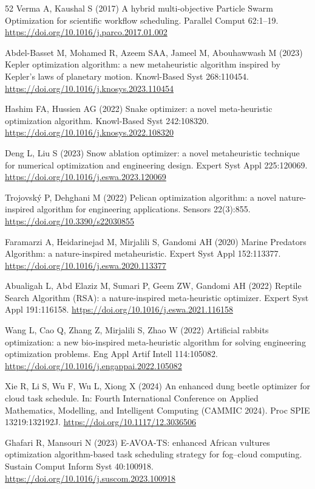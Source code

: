 \documentclass[pdflatex,onecolumn,sn-mathphys-num]{sn-jnl}
\begin{document}
\begin{thebibliography}{52}
Verma A, Kaushal S (2017) A hybrid multi-objective Particle Swarm Optimization for scientific workflow scheduling. Parallel Comput 62:1--19. \url{https://doi.org/10.1016/j.parco.2017.01.002}

Abdel-Basset M, Mohamed R, Azeem SAA, Jameel M, Abouhawwash M (2023) Kepler optimization algorithm: a new metaheuristic algorithm inspired by Kepler's laws of planetary motion. Knowl-Based Syst 268:110454. \url{https://doi.org/10.1016/j.knosys.2023.110454}

Hashim FA, Hussien AG (2022) Snake optimizer: a novel meta-heuristic optimization algorithm. Knowl-Based Syst 242:108320. \url{https://doi.org/10.1016/j.knosys.2022.108320}

Deng L, Liu S (2023) Snow ablation optimizer: a novel metaheuristic technique for numerical optimization and engineering design. Expert Syst Appl 225:120069. \url{https://doi.org/10.1016/j.eswa.2023.120069}

Trojovsk\'{y} P, Dehghani M (2022) Pelican optimization algorithm: a novel nature-inspired algorithm for engineering applications. Sensors 22(3):855. \url{https://doi.org/10.3390/s22030855}

Faramarzi A, Heidarinejad M, Mirjalili S, Gandomi AH (2020) Marine Predators Algorithm: a nature-inspired metaheuristic. Expert Syst Appl 152:113377. \url{https://doi.org/10.1016/j.eswa.2020.113377}

Abualigah L, Abd Elaziz M, Sumari P, Geem ZW, Gandomi AH (2022) Reptile Search Algorithm (RSA): a nature-inspired meta-heuristic optimizer. Expert Syst Appl 191:116158. \url{https://doi.org/10.1016/j.eswa.2021.116158}

Wang L, Cao Q, Zhang Z, Mirjalili S, Zhao W (2022) Artificial rabbits optimization: a new bio-inspired meta-heuristic algorithm for solving engineering optimization problems. Eng Appl Artif Intell 114:105082. \url{https://doi.org/10.1016/j.engappai.2022.105082}

Xie R, Li S, Wu F, Wu L, Xiong X (2024) An enhanced dung beetle optimizer for cloud task schedule. In: Fourth International Conference on Applied Mathematics, Modelling, and Intelligent Computing (CAMMIC 2024). Proc SPIE 13219:132192J. \url{https://doi.org/10.1117/12.3036506}

Ghafari R, Mansouri N (2023) E-AVOA-TS: enhanced African vultures optimization algorithm-based task scheduling strategy for fog--cloud computing. Sustain Comput Inform Syst 40:100918. \url{https://doi.org/10.1016/j.suscom.2023.100918}


\end{thebibliography}
\end{document}
